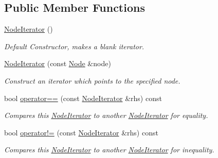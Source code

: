 \subsection*{Public Member Functions}
\begin{DoxyCompactItemize}
\item 
\hypertarget{classphys_1_1xml_1_1NodeIterator_af4558d54684f8ff49b88396f2d0fecd6}{
\hyperlink{classphys_1_1xml_1_1NodeIterator_af4558d54684f8ff49b88396f2d0fecd6}{NodeIterator} ()}
\label{da/d4f/classphys_1_1xml_1_1NodeIterator_af4558d54684f8ff49b88396f2d0fecd6}

\begin{DoxyCompactList}\small\item\em Default Constructor, makes a blank iterator. \item\end{DoxyCompactList}\item 
\hyperlink{classphys_1_1xml_1_1NodeIterator_abb8a4e6882e921fa57e309c28a5f7fe9}{NodeIterator} (const \hyperlink{classphys_1_1xml_1_1Node}{Node} \&node)
\begin{DoxyCompactList}\small\item\em Construct an iterator which points to the specified node. \item\end{DoxyCompactList}\item 
bool \hyperlink{classphys_1_1xml_1_1NodeIterator_a5c8ad72fbdbf0ae621fb041fef422a5e}{operator==} (const \hyperlink{classphys_1_1xml_1_1NodeIterator}{NodeIterator} \&rhs) const 
\begin{DoxyCompactList}\small\item\em Compares this \hyperlink{classphys_1_1xml_1_1NodeIterator}{NodeIterator} to another \hyperlink{classphys_1_1xml_1_1NodeIterator}{NodeIterator} for equality. \item\end{DoxyCompactList}\item 
bool \hyperlink{classphys_1_1xml_1_1NodeIterator_a357923a57edc54937743fb865be7c3b3}{operator!=} (const \hyperlink{classphys_1_1xml_1_1NodeIterator}{NodeIterator} \&rhs) const 
\begin{DoxyCompactList}\small\item\em Compares this \hyperlink{classphys_1_1xml_1_1NodeIterator}{NodeIterator} to another \hyperlink{classphys_1_1xml_1_1NodeIterator}{NodeIterator} for inequality. \item\end{DoxyCompactList}\item 

\end{DoxyCompactItemize}

